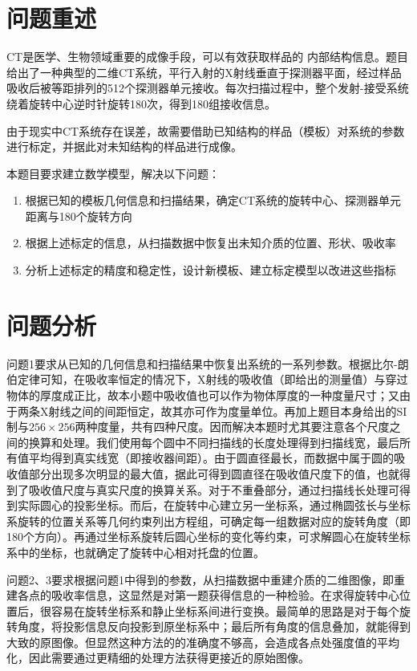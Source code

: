 \section{问题重述}
CT是医学、生物领域重要的成像手段，可以有效获取样品的 内部结构信息。题目给出了一种典型的二维CT系统，平行入射的X射线垂直于探测器平面，经过样品吸收后被等距排列的512个探测器单元接收。每次扫描过程中，整个发射-接受系统绕着旋转中心逆时针旋转180次，得到180组接收信息。

由于现实中CT系统存在误差，故需要借助已知结构的样品（模板）对系统的参数进行标定，并据此对未知结构的样品进行成像。

本题目要求建立数学模型，解决以下问题：

\begin{enumerate}
  \item 根据已知的模板几何信息和扫描结果，确定CT系统的旋转中心、探测器单元距离与180个旋转方向
  \item 根据上述标定的信息，从扫描数据中恢复出未知介质的位置、形状、吸收率
  \item 分析上述标定的精度和稳定性，设计新模板、建立标定模型以改进这些指标
\end{enumerate}

\section{问题分析}

问题1要求从已知的几何信息和扫描结果中恢复出系统的一系列参数。根据比尔-朗伯定律可知，在吸收率恒定的情况下，X射线的吸收值（即给出的测量值）与穿过物体的厚度成正比，故本小题中吸收值也可以作为物体厚度的一种度量尺寸；又由于两条X射线之间的间距恒定，故其亦可作为度量单位。再加上题目本身给出的SI制与$256\times256$两种度量，共有四种尺度。因而解决本题时尤其要注意各个尺度之间的换算和处理。我们使用每个圆中不同扫描线的长度处理得到扫描线宽，最后所有值平均得到真实线宽（即接收器间距）。由于圆直径最长，而数据中属于圆的吸收值部分出现多次明显的最大值，据此可得到圆直径在吸收值尺度下的值，也就得到了吸收值尺度与真实尺度的换算关系。对于不重叠部分，通过扫描线长处理可得到实际圆心的投影坐标。而后，在旋转中心建立另一坐标系，通过椭圆弦长与坐标系旋转的位置关系等几何约束列出方程组，可确定每一组数据对应的旋转角度（即180个方向）。再通过坐标系旋转后圆心坐标的变化等约束，可求解圆心在旋转坐标系中的坐标，也就确定了旋转中心相对托盘的位置。

问题2、3要求根据问题1中得到的参数，从扫描数据中重建介质的二维图像，即重建各点的吸收率信息，这显然是对第一题获得信息的一种检验。在求得旋转中心位置后，很容易在旋转坐标系和静止坐标系间进行变换。最简单的思路是对于每个旋转角度，将投影信息反向投影到原坐标系中；最后所有角度的信息叠加，就能得到大致的原图像。但显然这种方法的的准确度不够高，会造成各点处强度值的平均化，因此需要通过更精细的处理方法获得更接近的原始图像。


